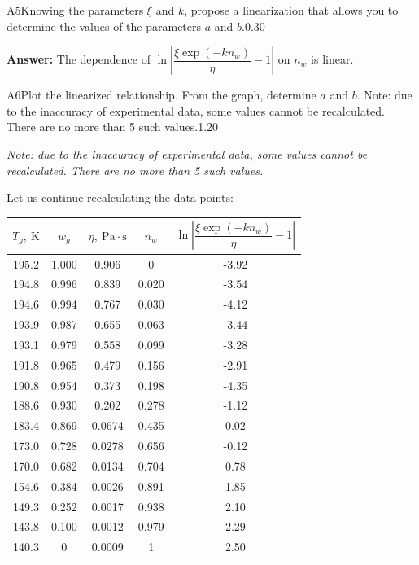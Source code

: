 \documentclass[11pt,a4paper]{article}
\begin{document}
\begin{solcard}{A5}{Knowing the parameters $\xi$ and $k$, propose a linearization that allows you to determine the values of the parameters $a$ and $b$.}{0.30}
\par\smallskip\noindent\textbf{Answer:} The dependence of $\ln\left|\dfrac{\xi \exp(-kn_w)}{\eta}-1\right|$ on $n_w$ is linear.
\end{solcard}

\begin{solcard}{A6}{Plot the linearized relationship. From the graph, determine $a$ and $b$. Note: due to the inaccuracy of experimental data, some values cannot be recalculated. There are no more than 5 such values.}{1.20}

\textit{Note: due to the inaccuracy of experimental data, some values cannot be recalculated. There are no more than 5 such values.}

Let us continue recalculating the data points:

\begin{table}[H]
\centering
\begin{tabular}{|c|c|c|c|c|}
\hline
$T_g,~\mathrm{K}$ & $w_g$ & $\eta,~\mathrm{Pa}\cdot\mathrm{s}$ & $n_w$ & $\ln\left|\dfrac{\xi \exp(-kn_w)}{\eta}-1\right|$ \\
\hline
195.2 & 1.000 & 0.906 & 0 & -3.92 \\
194.8 & 0.996 & 0.839 & 0.020 & -3.54 \\
194.6 & 0.994 & 0.767 & 0.030 & -4.12 \\
193.9 & 0.987 & 0.655 & 0.063 & -3.44 \\
193.1 & 0.979 & 0.558 & 0.099 & -3.28 \\
191.8 & 0.965 & 0.479 & 0.156 & -2.91 \\
190.8 & 0.954 & 0.373 & 0.198 & -4.35 \\
188.6 & 0.930 & 0.202 & 0.278 & -1.12 \\
183.4 & 0.869 & 0.0674 & 0.435 & 0.02 \\
173.0 & 0.728 & 0.0278 & 0.656 & -0.12 \\
170.0 & 0.682 & 0.0134 & 0.704 & 0.78 \\
154.6 & 0.384 & 0.0026 & 0.891 & 1.85 \\
149.3 & 0.252 & 0.0017 & 0.938 & 2.10 \\
143.8 & 0.100 & 0.0012 & 0.979 & 2.29 \\
140.3 & 0 & 0.0009 & 1 & 2.50 \\
\hline
\end{tabular}
\end{table}


\end{solcard}
\end{document}
